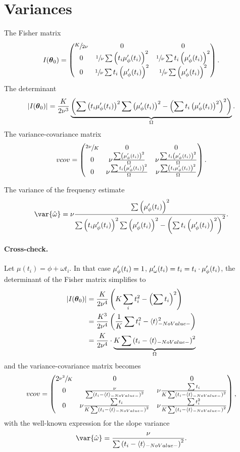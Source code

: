 \documentclass{article}
\begin{document}
\section{Variances}

The Fisher matrix
\[
	\Fisher = \begin{pmatrix}
	\sfrac{K}{2\nu} & 0 								& 0 \\
	0 				& \sfrac1\nu\sum\bkt{t_i\mupp}^2	& \sfrac1\nu\sum t_i\bkt{\mupp}^2 \\
	0				& \sfrac1\nu\sum t_i\bkt{\mupp}^2	&\sfrac1\nu\sum\bkt{\mupp}^2
	\end{pmatrix}.
\]
The determinant
\newcommand{\STM}{\Omega}
\[
	|\Fisher| = \frac{K}{2\nu^3}\underbrace{\bkt{\sum\bkt{t_i\mupp}^2\sum\bkt{\mupp}^2 - \bkt{\sum t_i\bkt{\mupp}^2}^2}}_{\STM}.
\]
The variance-covariance matrix
\[
vcov = \begin{pmatrix}
	\sfrac{2\nu}{K}& 0									& 0				\\
	0				&\nu\frac{\sum\bkt{\mupp}^2}{\STM}		&\nu\frac{\sum t_i\bkt{\mupp}^2}{\STM}\\
	0				&\nu\frac{\sum t_i\bkt{\mupp}^2}{\STM}	&\nu\frac{\sum\bkt{t_i\mupp}^2}{\STM}
\end{pmatrix}.
\]

The variance of the frequency estimate
\begin{equation}\label{eq:Var1}
	\var{\hat{\omega}} = \nu\frac{\sum\bkt{\mupp}^2}{\sum\bkt{t_i\mupp}^2\sum\bkt{\mupp}^2 - \bkt{\sum t_i\bkt{\mupp}^2}^2}.
\end{equation}

\paragraph{Cross-check.} Let $\mu(t_i) = \phi + \omega t_i$. In that case $\mupp = 1$, $\mu'_\omega(t_i) = t_i = t_i\cdot\mupp$, the determinant of the Fisher matrix simplifies to 
\begin{align*}
	|\Fisher| &= \frac{K}{2\nu^4}\bkt{K\sum_i t_i^2 - \bkt{\sum t_i}^2} \\
				 &= \frac{K^3}{2\nu^4}\bkt{\frac1K\sum t_i^2 - \avg{t}^2} \\
				 &= \frac{K}{2\nu^4}\cdot\underbrace{K\sum\bkt{t_i - \avg{t}}^2}_{\STM}
\end{align*}
\newcommand{\SSX}{\sum\bkt{t_i - \avg{t}}^2}
and the variance-covariance matrix becomes
\[
vcov = \begin{pmatrix}
	2\sfrac{\nu^2}{K}& 0									& 0				\\
	0				&\frac{\nu}{\SSX}		&\nu\frac{\sum t_i}{K\SSX}\\
	0				&\nu\frac{\sum t_i}{K\SSX}	&\nu\frac{\sum t_i^2}{K\SSX}
\end{pmatrix},
\]
with the well-known expression for the slope variance
\[
	\var{\hat\omega} = \frac{\nu}{\SSX}.
\]
\end{document}
